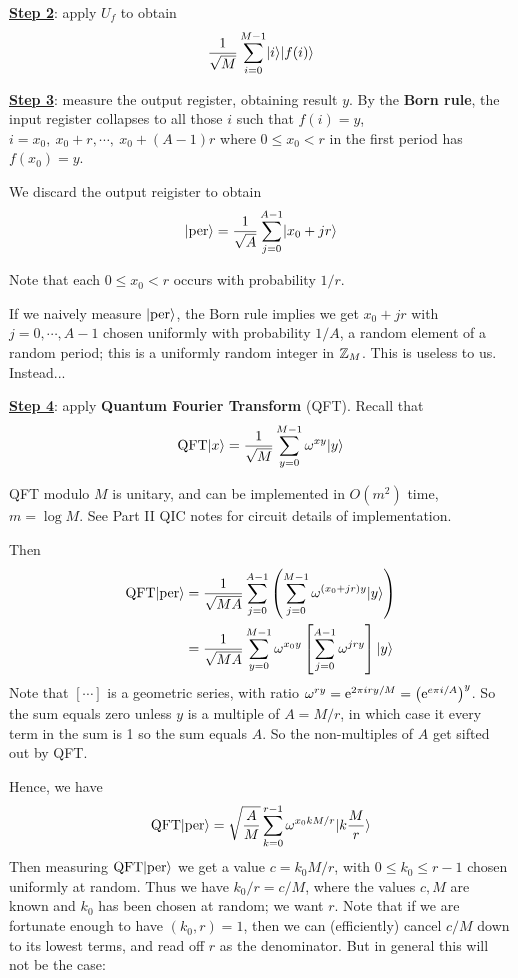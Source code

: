 \documentclass[]{article}
\newcommand{\QFT}{\textrm{QFT}}
\begin{document}
\underline{\textbf{Step 2}}: apply $U_f$ to obtain \[\frac{1}{\sqrt{M}}\sum_{i=0}^{M-1}\lvert i\rangle\lvert f(i)\rangle\]

\underline{\textbf{Step 3}}: measure the output register, obtaining result $y$. By the \textbf{Born rule}, the input register collapses to all those $i$ such that $f(i) = y$, \ie $i = x_0,\ x_0+r,\cdots,\ x_0+(A-1)r$ where $0\le x_0 < r$ in the first period has $f(x_0) = y$.

We discard the output reigister to obtain \[\lvert\textrm{per}\rangle = \frac{1}{\sqrt{A}}\sum_{j=0}^{A-1}\lvert x_0+jr\rangle\]

Note that each $0\le x_0 < r$ occurs with probability $1/r$.

If we naively measure $\lvert\textrm{per}\rangle$, the Born rule implies we get $x_0 + jr$ with $j = 0,\cdots,A-1$ chosen uniformly with probability $1/A$, \ie a random element of a random period; this is a uniformly random integer in $\mathbb{Z}_M$. This is useless to us. Instead...

\underline{\textbf{Step 4}}: apply \textbf{Quantum Fourier Transform} (QFT).
Recall that
\[
\textrm{QFT}\lvert x\rangle = \frac{1}{\sqrt{M}} \sum_{y=0}^{M-1} \omega^{xy} \lvert y\rangle
\]
\begin{remark*}[Fact]
QFT modulo $M$ is unitary, and can be implemented in $O(m^2)$ time, $m = \log M$. See Part II QIC notes for circuit details of implementation.
\end{remark*}

Then
\begin{align*}
	\QFT\ket{\textrm{per}} &= \frac{1}{\sqrt{MA}}\sum_{j=0}^{A-1} \left(\sum_{j=0}^{M-1}\omega^{(x_0+jr)y}\ket{y}\right)\\
	&=\frac{1}{\sqrt{MA}}\sum_{y=0}^{M-1}\omega^{x_0y}\left[\sum_{j=0}^{A-1}\omega^{jry}\right]\ket{y}
\end{align*}
Note that $[\cdots]$ is a geometric series, with ratio $\omega^{ry} = \mathrm{e}^{2\pi iry/M} = \left(\mathrm{e}^{e\pi i/A}\right)^y$. So the sum equals zero unless $y$ is a multiple of $A = M/r$, in which case it every term in the sum is 1 so the sum equals $A$. So the non-multiples of $A$ get sifted out by QFT.

Hence, we have
\begin{align*}
\QFT\ket{\textrm{per}} = \sqrt{\frac{A}{M}}\sum_{k=0}^{r-1}\omega^{x_0kM/r}\ket{k\frac{M}{r}}
\end{align*}
Then measuring $\QFT\ket{\textrm{per}}$ we get a value $c = k_0 M/r$, with $0\le k_0\le r-1$ chosen uniformly at random. Thus we have $k_0/r = c/M$, where the values $c,M$ are known and $k_0$ has been chosen at random; we want $r$. Note that if we are fortunate enough to have $(k_0,r) = 1$, then we can (efficiently) cancel $c/M$ down to its lowest terms, and read off $r$ as the denominator. But in general this will not be the case:
\end{document}
